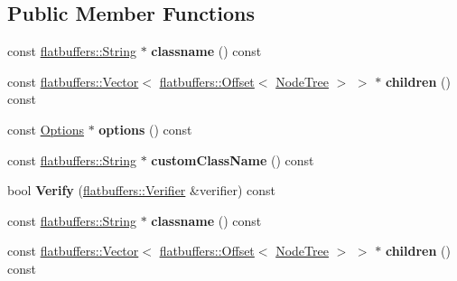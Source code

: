 \subsection*{Public Member Functions}
\begin{DoxyCompactItemize}
\item 
\mbox{\label{structflatbuffers_1_1NodeTree_ac88f5b32637ba78fb19c448f06f3ebaf}} 
const \hyperlink{structflatbuffers_1_1String}{flatbuffers\+::\+String} $\ast$ {\bfseries classname} () const
\item 
\mbox{\label{structflatbuffers_1_1NodeTree_ab9185c5fbba03162fef7448fb8a4090e}} 
const \hyperlink{classflatbuffers_1_1Vector}{flatbuffers\+::\+Vector}$<$ \hyperlink{structflatbuffers_1_1Offset}{flatbuffers\+::\+Offset}$<$ \hyperlink{structflatbuffers_1_1NodeTree}{Node\+Tree} $>$ $>$ $\ast$ {\bfseries children} () const
\item 
\mbox{\label{structflatbuffers_1_1NodeTree_a0b0963664da12030a3876c50be6df9c3}} 
const \hyperlink{structflatbuffers_1_1Options}{Options} $\ast$ {\bfseries options} () const
\item 
\mbox{\label{structflatbuffers_1_1NodeTree_ab4e63b6319d2f792dda015482805cdbc}} 
const \hyperlink{structflatbuffers_1_1String}{flatbuffers\+::\+String} $\ast$ {\bfseries custom\+Class\+Name} () const
\item 
\mbox{\label{structflatbuffers_1_1NodeTree_a95fa31f848f6988171eb28c837140d8d}} 
bool {\bfseries Verify} (\hyperlink{classflatbuffers_1_1Verifier}{flatbuffers\+::\+Verifier} \&verifier) const
\item 
\mbox{\label{structflatbuffers_1_1NodeTree_ac88f5b32637ba78fb19c448f06f3ebaf}} 
const \hyperlink{structflatbuffers_1_1String}{flatbuffers\+::\+String} $\ast$ {\bfseries classname} () const
\item 
\mbox{\label{structflatbuffers_1_1NodeTree_ab9185c5fbba03162fef7448fb8a4090e}} 
const \hyperlink{classflatbuffers_1_1Vector}{flatbuffers\+::\+Vector}$<$ \hyperlink{structflatbuffers_1_1Offset}{flatbuffers\+::\+Offset}$<$ \hyperlink{structflatbuffers_1_1NodeTree}{Node\+Tree} $>$ $>$ $\ast$ {\bfseries children} () const

\end{DoxyCompactItemize}
